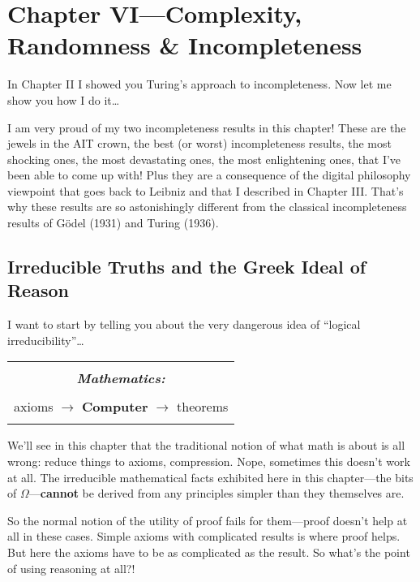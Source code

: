 \documentclass[12pt]{book}
\begin{document}
\chapter*{Chapter VI---Complexity, Randomness \& Incompleteness}

In Chapter II I showed you Turing's approach to incompleteness.
Now let me show you how I do it\ldots
 
I am very proud of my two incompleteness results in this chapter!
These are the jewels in the AIT crown, the best (or worst) incompleteness results,
the most shocking ones, the most devastating ones, the most enlightening ones,
that I've been able to come up with!
Plus they are a consequence of the digital philosophy viewpoint that goes back to
Leibniz and that I described in Chapter III. That's why these results are so astonishingly
different from the classical incompleteness results of G\"odel (1931) and Turing (1936).

\section*{Irreducible Truths and the Greek Ideal of Reason}

I want to start by telling you about the very dangerous idea of
``logical irreducibility''\ldots
\begin{center}
\begin{tabular}{|c|}
\hline
\\
\textbf{\emph{\large Mathematics:}}
\\ \\
axioms $\longrightarrow$ \textbf{\large Computer} $\longrightarrow$ theorems
\\
\\
\hline
\end{tabular}
\end{center}
We'll see in this chapter that
the traditional notion of what math is about is all wrong: reduce things to axioms,
compression. Nope, sometimes this doesn't work at all. The irreducible mathematical facts
exhibited here in this chapter---the bits of $\Omega$---\textbf{cannot} be derived from 
any principles simpler than they themselves are.
 
So the normal notion of the utility of proof fails for them---proof doesn't help at all
in these cases.
Simple axioms with complicated results is where proof helps.
But here the axioms have to be as complicated as the result. So what's the point
of using reasoning at all?!
 
\end{document}
